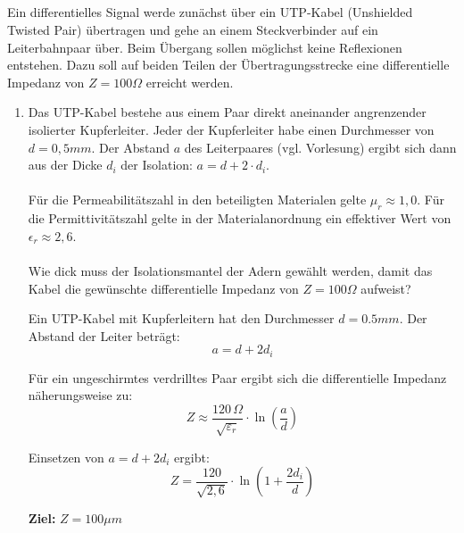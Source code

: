 \documentclass[a4paper]{article}
\begin{document}
\subsection{}
Ein differentielles Signal werde zunächst über ein UTP-Kabel (Unshielded Twisted Pair) übertragen und gehe an einem Steckverbinder auf ein Leiterbahnpaar über. Beim Übergang sollen
möglichst keine Reflexionen entstehen. Dazu soll auf beiden Teilen der Übertragungsstrecke eine differentielle Impedanz von $Z = 100 \Omega$ erreicht werden.
\begin{enumerate}[label=\alph*)]
    \item Das UTP-Kabel bestehe aus einem Paar direkt aneinander angrenzender isolierter Kupferleiter. Jeder der Kupferleiter habe einen Durchmesser von $d = 0,5 mm$. Der Abstand $a$ des Leiterpaares (vgl. Vorlesung) ergibt sich dann aus der Dicke $d_i$ der Isolation: $a = d+2\cdot d_i$.\\\\
    Für die Permeabilitätszahl in den beteiligten Materialen gelte $\mu_r \approx 1,0$. Für die Permittivitätszahl gelte in der Materialanordnung ein effektiver Wert von $\epsilon_r \approx 2,6$.\\\\
    Wie dick muss der Isolationsmantel der Adern gewählt werden, damit das Kabel die gewünschte differentielle Impedanz von $Z = 100 \Omega$ aufweist?

    Ein UTP-Kabel mit Kupferleitern hat den Durchmesser \( d = 0.5mm \). Der Abstand der Leiter beträgt:
    \[
    a = d + 2d_i
    \]
    
    Für ein ungeschirmtes verdrilltes Paar ergibt sich die differentielle Impedanz näherungsweise zu:
    \[
    Z \approx \frac{120\,\Omega}{\sqrt{\varepsilon_r}} \cdot \ln\left( \frac{a}{d} \right)
    \]
    
    Einsetzen von \( a = d + 2d_i \) ergibt:
    \[
    Z = \frac{120}{\sqrt{2{,}6}} \cdot \ln\left(1 + \frac{2d_i}{d} \right)
    \]
    
    \textbf{Ziel:} \( Z = 100\mu m \)
    
    \vspace{1em}
    

\end{enumerate}
\end{document}
